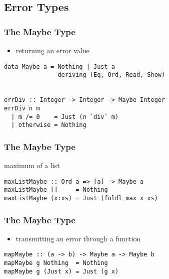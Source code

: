 \documentclass[dvipsnames]{beamer}
\theoremstyle{plain}
\begin{document}
\subsection{Error Types}

\begin{frame}[fragile]
  \frametitle{The Maybe Type}

  \begin{itemize}
    \item returning an error value
  \end{itemize}

  \begin{exampleblock}{}
    \begin{lstlisting}
data Maybe a = Nothing | Just a
               deriving (Eq, Ord, Read, Show)


errDiv :: Integer -> Integer -> Maybe Integer
errDiv n m
  | m /= 0    = Just (n `div` m)
  | otherwise = Nothing
    \end{lstlisting}
  \end{exampleblock}
\end{frame}

\begin{frame}[fragile]
  \frametitle{The Maybe Type}

  \begin{exampleblock}{maximum of a list}
    \begin{lstlisting}
maxListMaybe :: Ord a => [a] -> Maybe a
maxListMaybe []     = Nothing
maxListMaybe (x:xs) = Just (foldl max x xs)
    \end{lstlisting}
  \end{exampleblock}
\end{frame}

\begin{frame}[fragile]
  \frametitle{The Maybe Type}

  \begin{itemize}
    \item transmitting an error through a function
  \end{itemize}

  \begin{exampleblock}{}
    \begin{lstlisting}
mapMaybe :: (a -> b) -> Maybe a -> Maybe b
mapMaybe g Nothing  = Nothing
mapMaybe g (Just x) = Just (g x)
    \end{lstlisting}
  \end{exampleblock}
\end{frame}
\end{document}

